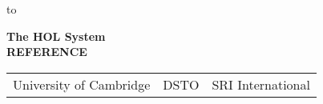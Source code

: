 

\begin{titlepage}
\null\vskip-47pt
\hbox to 

\setcounter{page}{1}                      %

\vspace*{60mm}


\begin{center}
 {\Huge\bf The HOL System}\\[0.4cm]
{\LARGE\bf REFERENCE}\\[2.5cm]
\end{center}

\vspace*{100mm}
\begin{center}
\begin{tabular}{ccc}
University of Cambridge & \hspace*{10ex}DSTO\hspace*{10ex} & SRI International
\end{tabular}
\end{center}

\vfill
\end{titlepage}

\thispagestyle{empty}
\mbox{}
\newpage

